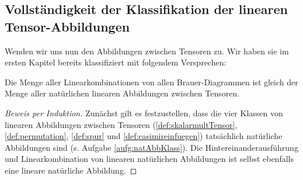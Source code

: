 \subsection{Vollständigkeit der Klassifikation der linearen Tensor-Abbildungen}
Wenden wir uns nun den Abbildungen zwischen Tensoren zu. Wir haben sie im ersten Kapitel bereits klassifiziert mit folgendem Versprechen:
\begin{theorem}
	\label{brauer:klassifikation}
	Die Menge aller Linearkombinationen von allen Brauer-Diagrammen ist gleich der Menge aller natürlichen linearen Abbildungen zwischen Tensoren.
\end{theorem}
\begin{proof}[Beweis per Induktion]
Zunächst gilt es festzustellen, dass die vier Klassen von linearen Abbildungen zwischen Tensoren (\ref{def:skalarmultTensor}, \ref{def:permutation}, \ref{def:spur} und \ref{def:casimireinfuegen}) tatsächlich natürliche Abbildungen sind (s. Aufgabe \ref{aufg:natAbbKlass}).
Die Hintereinanderausführung und Linearkombination von linearen natürlichen Abbildungen ist selbst ebenfalls eine lineare natürliche Abbildung. 
 

\end{proof}
